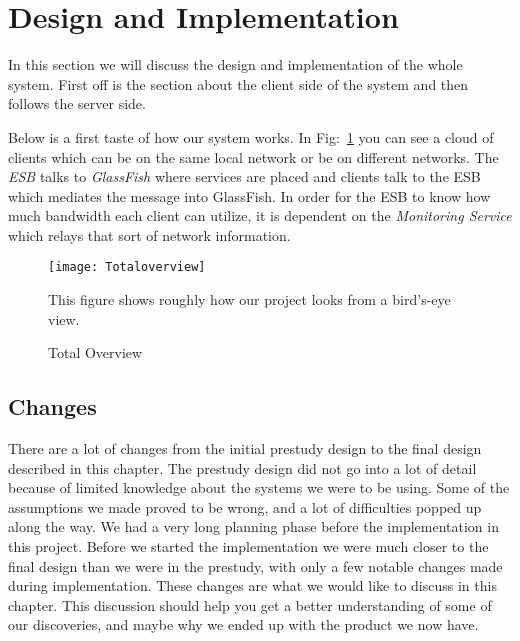 \section{Design and Implementation}\label{Design and Implementation}
	In this section we will discuss the design and implementation of the whole system. First off is the section about the client side of the system and then follows the server side. 
	
	Below is a first taste of how our system works. In Fig:~\ref{fig:totaloverview} you can see a cloud of clients which can be on the same local network or be on different networks. The \textit{ESB} talks to \textit{GlassFish} where services are placed and clients talk to the ESB which mediates the message into GlassFish. In order for the ESB to know how much bandwidth each client can utilize, it is dependent on the \textit{Monitoring Service} which relays that sort of network information.
    
    \begin{figure}[H]
        \centering
        \texttt{[image: Totaloverview]}
        \caption{Total Overview}
        This figure shows roughly how our project looks from a bird's-eye view.
        \label{fig:totaloverview}
    \end{figure}

    
    
    
    \subsection{Changes}\label{Changes}
        There are a lot of changes from the initial prestudy design to the final design described in this chapter. The prestudy design did not go into a lot of detail because of limited knowledge about the systems we were to be using. Some of the assumptions we made proved to be wrong, and a lot of difficulties popped up along the way. We had a very long planning phase before the implementation in this project. Before we started the implementation we were much closer to the final design than we were in the prestudy, with only a few notable changes made during implementation. These changes are what we would like to discuss in this chapter. This discussion should help you get a better understanding of some of our discoveries, and maybe why we ended up with the product we now have.
     
   
   
   
